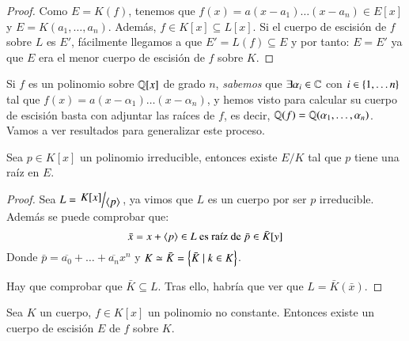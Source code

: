 \begin{proof}
    Como $E = K(f)$, tenemos que $f(x) = a (x - a_1) \ldots (x - a_n) \in E[x]$ y $E = K(a_1, \ldots, a_n)$. Además, $f \in K[x] \subseteq L[x]$. Si el cuerpo de escisión de $f$ sobre $L$ es $E'$, fácilmente llegamos a que $E' = L(f) \subseteq E$ y por tanto: $E = E'$ ya que $E$ era el menor cuerpo de escisión de $f$ sobre $K$.
\end{proof}

Si $f$ es un polinomio sobre $\mathbb{Q}[x]$ de grado $n$, \textit{sabemos} que $\exists \alpha_i \in \mathbb{C}$ con $i \in \left\{1, \ldots n\right\}$ tal que $f(x) = a (x - \alpha_1) \ldots (x - \alpha_n)$, y hemos visto para calcular su cuerpo de escisión basta con adjuntar las raíces de $f$, es decir, $\mathbb{Q}(f) = \mathbb{Q}(\alpha_1, \ldots, \alpha_n)$.\\

Vamos a ver resultados para generalizar este proceso.

\begin{lm}\label{lm:3.3}
    Sea $p \in K[x]$ un polinomio irreducible, entonces existe $E/K$ tal que $p$ tiene una raíz en $E$.
\end{lm}

\begin{proof}
    Sea $L = \quo{K[x]}{\gen{p}}$, ya vimos que $L$ es un cuerpo por ser $p$ irreducible. Además se puede comprobar que:
    $$
        \bar x = x + \langle p\rangle \in L \text{ es raíz de } \bar p \in \bar K[y]
    $$
    Donde $\bar p = \overline{a_0} + \ldots + \overline{a_n}x^n$ y $K \simeq \bar K = \left\{\bar K \mid k \in K\right\}$.

    Hay que comprobar que $\bar K \subseteq L$. Tras ello, habría que ver que $L = \bar K(\bar x)$.
\end{proof}

\begin{thm}\label{thm:3.4}
    Sea $K$ un cuerpo, $f \in K[x]$ un polinomio no constante. Entonces existe un cuerpo de escisión $E$ de $f$ sobre $K$.
\end{thm}

